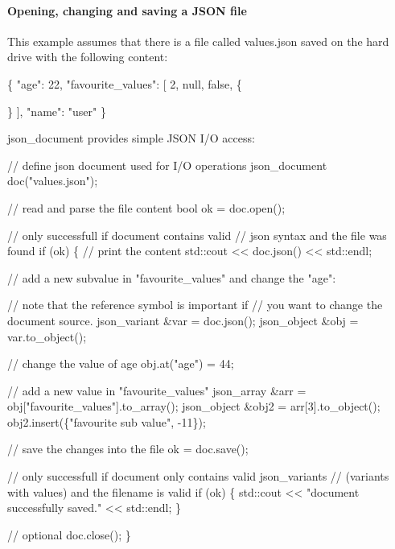 \paragraph*{\label{_opening_changing_section}%
Opening, changing and saving a J\+S\+ON file}

This example assumes that there is a file called {\ttfamily values.\+json} saved on the hard drive with the following content\+: 
\begin{DoxyCode}
\{
    "age": 22,
    "favourite\_values": [
        2,
        null,
        false,
        \{

        \}
    ],
    "name": "user"
\}
\end{DoxyCode}
 {\ttfamily json\+\_\+document} provides simple J\+S\+ON I/O access\+: 
\begin{DoxyCode}
\textcolor{comment}{// define json document used for I/O operations}
json\_document doc(\textcolor{stringliteral}{"values.json"});

\textcolor{comment}{// read and parse the file content}
\textcolor{keywordtype}{bool} ok = doc.open();

\textcolor{comment}{// only successfull if document contains valid }
\textcolor{comment}{// json syntax and the file was found}
\textcolor{keywordflow}{if} (ok) \{
    \textcolor{comment}{// print the content}
    std::cout << doc.json() << std::endl;

    \textcolor{comment}{// add a new subvalue in "favourite\_values" and change the "age":}

    \textcolor{comment}{// note that the reference symbol is important if }
    \textcolor{comment}{// you want to change the document source.}
    json\_variant &var = doc.json();
    json\_object &obj = var.to\_object();

    \textcolor{comment}{// change the value of age}
    obj.at(\textcolor{stringliteral}{"age"}) = 44;

    \textcolor{comment}{// add a new value in "favourite\_values" }
    json\_array &arr = obj[\textcolor{stringliteral}{"favourite\_values"}].to\_array();
    json\_object &obj2 = arr[3].to\_object();
    obj2.insert(\{\textcolor{stringliteral}{"favourite sub value"}, -11\});

    \textcolor{comment}{// save the changes into the file}
    ok = doc.save();

    \textcolor{comment}{// only successfull if document only contains valid json\_variants}
    \textcolor{comment}{// (variants with values) and the filename is valid}
    \textcolor{keywordflow}{if} (ok) \{ 
        std::cout << \textcolor{stringliteral}{"document successfully saved."} << std::endl;
    \}

    \textcolor{comment}{// optional}
    doc.close(); 
\}
\end{DoxyCode}


